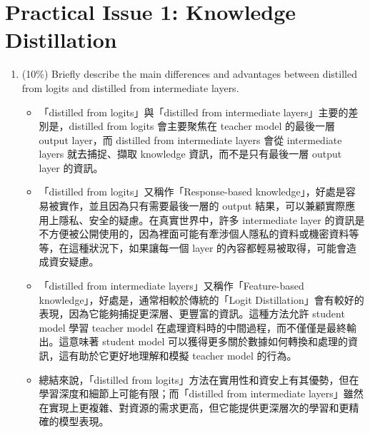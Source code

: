 \documentclass[10pt,a4paper]{article}
\begin{document}
\section*{Practical Issue 1: Knowledge Distillation}
\begin{enumerate}
\item (10\%) Briefly describe the main differences and advantages between distilled from logits and distilled from intermediate layers.
\begin{itemize}
\item 「distilled from logits」與「distilled from intermediate layers」主要的差別是，distilled from logits 會主要聚焦在 teacher model 的最後一層 output layer，而 distilled from intermediate layers 會從 intermediate layers 就去捕捉、擷取 knowledge 資訊，而不是只有最後一層 output layer 的資訊。
\item 「distilled from logits」又稱作「Response-based knowledge」，好處是容易被實作，並且因為只有需要最後一層的 output 結果，可以兼顧實際應用上隱私、安全的疑慮。在真實世界中，許多 intermediate layer 的資訊是不方便被公開使用的，因為裡面可能有牽涉個人隱私的資料或機密資料等等，在這種狀況下，如果讓每一個 layer 的內容都輕易被取得，可能會造成資安疑慮。
\item 「distilled from intermediate layers」又稱作「Feature-based knowledge」，好處是，通常相較於傳統的「Logit Distillation」會有較好的表現，因為它能夠捕捉更深層、更豐富的資訊。這種方法允許 student model 學習 teacher model 在處理資料時的中間過程，而不僅僅是最終輸出。這意味著 student model 可以獲得更多關於數據如何轉換和處理的資訊，這有助於它更好地理解和模擬 teacher model 的行為。
\item 總結來說，「distilled from logits」方法在實用性和資安上有其優勢，但在學習深度和細節上可能有限；而「distilled from intermediate layers」雖然在實現上更複雜、對資源的需求更高，但它能提供更深層次的學習和更精確的模型表現。
\end{itemize}


\end{enumerate}
\end{document}
